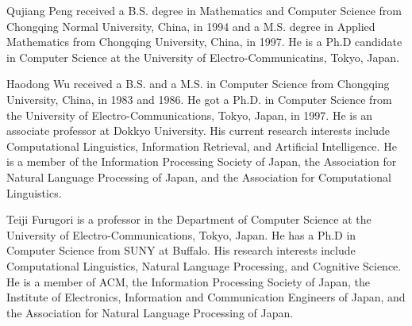 \begin{biography}

\biotitle{}

{
Qujiang Peng received a B.S. degree in Mathematics and Computer Science 
from Chongqing Normal University, China, in 1994 and a M.S. degree in 
Applied Mathematics from Chongqing University, China, in 1997. He is a Ph.D 
candidate in Computer Science at the University of Electro-Communicatins, 
Tokyo, Japan.
}

{
Haodong Wu received a B.S. and a M.S. in Computer Science from Chongqing 
University, China, in 1983 and 1986. He got a Ph.D. in Computer Science from 
the University of Electro-Communications, Tokyo, Japan, in 1997. He is an 
associate professor at Dokkyo University. His current research interests 
include Computational Linguistics, Information Retrieval, and Artificial 
Intelligence. He is a member of the Information Processing Society of Japan, 
the Association for Natural Language Processing of Japan, and the Association 
for Computational Linguistics.
}

{
Teiji Furugori is a professor in the Department of Computer Science at the 
University of Electro-Communications, Tokyo, Japan. He has a Ph.D in Computer 
Science from SUNY at Buffalo. His research interests include Computational 
Linguistics, Natural Language Processing, and Cognitive Science. He is a member 
of ACM, the Information Processing Society of Japan, the Institute of Electronics, 
Information and Communication Engineers of Japan, and the Association for 
Natural Language Processing of Japan.
}



\end{biography}




